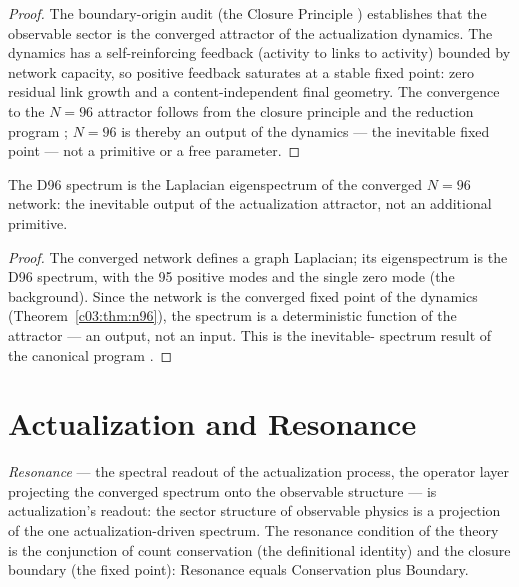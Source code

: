 \begin{proof}
The boundary-origin audit (the Closure Principle \cite{c03:QG282}) establishes that the
observable sector is the converged attractor of the actualization dynamics. The dynamics has
a self-reinforcing feedback (activity to links to activity) bounded by network capacity, so
positive feedback saturates at a stable fixed point: zero residual link growth and a
content-independent final geometry. The convergence to the $N=96$ attractor follows from the
closure principle \cite{c03:QG282} and the reduction program \cite{c03:QG293,c03:QG294};
$N=96$ is thereby an output of the dynamics --- the inevitable fixed point --- not a
primitive or a free parameter.
\end{proof}

\begin{corollary}
\label{c03:cor:spectrum-eigenspectrum}
The D96 spectrum is the Laplacian eigenspectrum of the converged $N=96$ network: the
inevitable output of the actualization attractor, not an additional primitive.
\end{corollary}

\begin{proof}
The converged network defines a graph Laplacian; its eigenspectrum is the D96 spectrum, with
the 95 positive modes and the single zero mode (the background). Since the network is the
converged fixed point of the dynamics (Theorem~\ref{c03:thm:n96}), the spectrum is a
deterministic function of the attractor --- an output, not an input. This is the inevitable-
spectrum result of the canonical program \cite{c03:QG293,c03:QG294}.
\end{proof}

\section{Actualization and Resonance}
\label{c03:sec:actualization-resonance}

\begin{theorem}
\label{c03:thm:resonance-readout}
\emph{Resonance} --- the spectral readout of the actualization process, the operator layer
projecting the converged spectrum onto the observable structure --- is actualization's
readout: the sector structure of observable physics is a projection of the one
actualization-driven spectrum. The resonance condition of the theory is the conjunction of
count conservation (the definitional identity) and the closure boundary (the fixed point):
Resonance equals Conservation plus Boundary.
\end{theorem}

